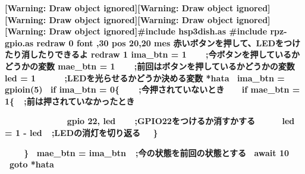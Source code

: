 \documentclass[a4paper,dvipdfmx]{jarticle}
\begin{document}
{\ttfamily\bfseries
[Warning: Draw object ignored][Warning: Draw object ignored][Warning: Draw object ignored][Warning: Draw object
ignored][Warning: Draw object ignored]\#include {\textquotedbl}hsp3dish.as{\textquotedbl}\newline
\#include {\textquotedbl}rpz-gpio.as{\textquotedbl}\newline
\newline
 redraw 0\newline
 font {\textquotedbl}{\textquotedbl},30\newline
 pos 20,20\newline
 mes
{\textquotedbl}赤いボタンを押して、LEDをつけたり消したりできるよ{\textquotedbl}\newline
 redraw 1\newline
\newline
 ima\_btn =
1\ \ \ \ \textcolor[rgb]{0.2,0.2,1.0}{;今ボタンを押しているかどうかの変数}\newline
 mae\_btn =
1\ \ \ \ \textcolor[rgb]{0.2,0.2,1.0}{;前回はボタンを押しているかどうかの変数}\newline
 led =
1\ \ \ \ \ \ \textcolor[rgb]{0.2,0.2,1.0}{;LEDを光らせるかどうか決める変数}\newline
\newline
*hata\newline
 \ ima\_btn = gpioin(5)\newline
 \ if ima\_btn =
0\{\ \ \ \ \textcolor[rgb]{0.2,0.2,1.0}{;今押されていないとき
}\newline
 \ \ \ if mae\_btn =
1\{\ \ \textcolor[rgb]{0.2,0.2,1.0}{;前は押されていなかったとき}}

{\ttfamily\bfseries
\ \ \ \ \ \ \ \ \ \ \ \ \ gpio 22,
led\ \ \ \ \textcolor[rgb]{0.2,0.2,1.0}{;GPIO22をつけるか消すかする}\newline
 \ \ \ \ \ led = 1 -
led\ \ \textcolor[rgb]{0.2,0.2,1.0}{;LEDの消灯を切り返る}\newline
 \ \ \}}

{\ttfamily\bfseries
\ \ \ \ \}\newline
 \ mae\_btn =
ima\_btn\ \ \textcolor[rgb]{0.2,0.2,1.0}{;今の状態を前回の状態とする}\newline
\newline
 \ await 10\newline
 \ goto *hata\newline
}


\bigskip


\bigskip


\bigskip
\end{document}
